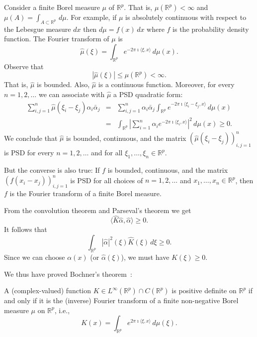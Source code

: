 Consider a finite Borel measure $\mu$ of $\mathbb{R}^p$. That is, $\mu(\mathbb{R}^p) < \infty$ and $\mu(A) = \int_{A \subset \mathbb{R}^p} \,d\mu$. For example, if $\mu$ is absolutely continuous with respect to the Lebesgue measure $dx$ then $d\mu = f(x)\,dx$ where $f$ is the probability density function. The Fourier transform of $\mu$ is
\begin{equation}
\hat{\mu}(\xi) = \int_{\mathbb{R}^p} e^{-2\pi \imath \langle \xi, x \rangle}\,d\mu(x).
\end{equation}
Observe that
\begin{equation}
|\hat{\mu}(\xi)| \leq \mu(\mathbb{R}^p) < \infty.
\end{equation}
That is, $\hat{\mu}$ is bounded. Also, $\hat{\mu}$ is a continuous function. Moreover, for every $n=1,2,\ldots$ we can associate with $\hat{\mu}$ a PSD quadratic form:
\begin{eqnarray}
\sum_{i,j=1}^n \hat{\mu}(\xi_i-\xi_j) \alpha_i \bar{\alpha}_j &=& \sum_{i,j=1}^n \alpha_i \bar{\alpha}_j \int_{\mathbb{R}^p} e^{-2\pi \imath \langle \xi_i - \xi_j, x\rangle}\,d\mu(x) \\
&=& \int_{\mathbb{R}^p} \left| \sum_{i=1}^n \alpha_i e^{-2\pi \imath \langle \xi_i, x \rangle }\right|^2 \,d\mu(x) \geq 0.
\end{eqnarray}
We conclude that $\hat{\mu}$ is bounded, continuous, and the matrix $(\hat{\mu}(\xi_i-\xi_j))_{i,j=1}^n$ is PSD for every $n=1,2,\ldots$ and for all $\xi_1,\ldots,\xi_n \in \mathbb{R}^p$.

But the converse is also true: If $f$ is bounded, continuous, and the matrix $(f(x_i-x_j))_{i,j=1}^n$ is PSD for all choices of $n=1,2,\ldots$ and $x_1,\ldots,x_n\in \mathbb{R}^p$, then $f$ is the Fourier transform of a finite Borel measure.




From the convolution theorem and Parseval's theorem we get
\begin{equation}
\langle \hat{K}  \hat{\alpha}, \hat{\alpha}  \rangle \geq 0.
\end{equation}
It follows that
\begin{equation}
\int_{\mathbb{R}^p} |\hat{\alpha}|^2(\xi) \hat{K}(\xi)\,d\xi \geq 0.
\end{equation}
Since we can choose $\alpha(x)$ (or $\hat{\alpha}(\xi)$), we must have $\hat{K}(\xi) \geq 0$. 

We thus have proved  Bochner's theorem~\cite{bochner1932vorlesungen}:
\begin{theorem}\label{th:bochner}
A (complex-valued) function $K \in L^{\infty}(\mathbb{R}^p) \cap C(\mathbb{R}^p)$ is positive definite on $\mathbb{R}^p$
if and only if it is the (inverse) Fourier transform of a finite non-negative
Borel measure $\mu$ on $\mathbb{R}^p$, i.e.,
\begin{equation}
K(x) = \int_{\mathbb{R}^p} e^{2\pi \imath \langle \xi, x \rangle}\,d\mu(\xi).
\end{equation}
\end{theorem}

